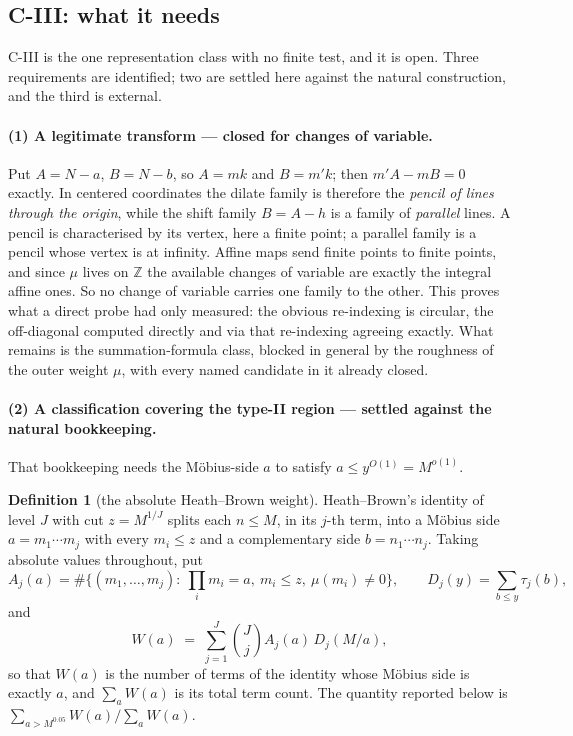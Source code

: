 \documentclass[11pt,a4paper]{article}
\theoremstyle{plain}
\theoremstyle{definition}
\newtheorem{definition}[theorem]{Definition}
\begin{document}
\subsection{C-III: what it needs}\label{sec:c3}

C-III is the one representation class with no finite test, and it is
open. Three requirements are identified; two are settled here against
the natural construction, and the third is external.

\paragraph{(1) A legitimate transform --- closed for changes of
variable.} Put $A = N-a$, $B = N-b$, so $A = mk$ and $B = m'k$; then
$m'A - mB = 0$ exactly. In centered coordinates the dilate family is
therefore the \emph{pencil of lines through the origin}, while the
shift family $B = A - h$ is a family of \emph{parallel} lines. A
pencil is characterised by its vertex, here a finite point; a parallel
family is a pencil whose vertex is at infinity. Affine maps send
finite points to finite points, and since $\mu$ lives on $\mathbb Z$
the available changes of variable are exactly the integral affine
ones. So no change of variable carries one family to the other. This
proves what a direct probe had only measured: the obvious re-indexing
is circular, the off-diagonal computed directly and via that
re-indexing agreeing exactly. What remains is the summation-formula
class, blocked in general by the roughness of the outer weight $\mu$,
with every named candidate in it already closed.

\paragraph{(2) A classification covering the type-II region ---
settled against the natural bookkeeping.} That bookkeeping needs the
M\"obius-side $a$ to satisfy $a \le y^{O(1)} = M^{o(1)}$.

\begin{definition}[the absolute Heath--Brown weight]\label{def:hbw}
Heath--Brown's identity of level $J$ with cut $z = M^{1/J}$ splits each
$n\le M$, in its $j$-th term, into a M\"obius side $a = m_1\cdots m_j$
with every $m_i\le z$ and a complementary side $b = n_1\cdots n_j$.
Taking absolute values throughout, put
\[
  A_j(a) = \#\{(m_1,\dots,m_j):\ \textstyle\prod_i m_i = a,\
     m_i\le z,\ \mu(m_i)\neq0\},
  \qquad
  D_j(y) = \sum_{b\le y}\tau_j(b),
\]
and
\[
  W(a) \;=\; \sum_{j=1}^{J}\binom{J}{j}A_j(a)\,D_j(M/a),
\]
so that $W(a)$ is the number of terms of the identity whose M\"obius
side is exactly $a$, and $\sum_a W(a)$ is its total term count. The
quantity reported below is $\sum_{a>M^{0.05}}W(a)\big/\sum_a W(a)$.
\end{definition}
\end{document}
